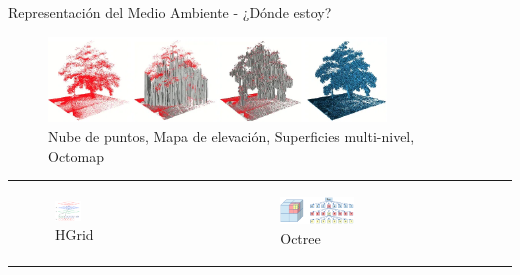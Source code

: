 \documentclass[
  24pt, %
  aspectratio=169, %
]{beamer}
\begin{document}
\begin{frame}{Representación del Medio Ambiente - ¿Dónde estoy?}
  \centering
  \begin{figure}[h]
    \includegraphics[width=0.8\textwidth,height=0.35\textheight]{img4}%
    {\tiny \caption{Nube de puntos, Mapa de elevación, Superficies multi-nivel, Octomap}}
  \end{figure}
  
  \addvspace{\medskipamount}
  \noindent
  \begin{tabularx}{\linewidth}{ @{} X X @{} }
    
    \begin{figure}[h]
      \includegraphics[width=0.2\textwidth,height=0.3\textheight]{hgrid}
      {\tiny \caption{HGrid}}
    \end{figure}
    &
    \begin{figure}[h]
      \includegraphics[width=0.4\textwidth,height=0.3\textheight]{octree}
      {\tiny \caption{Octree}}
    \end{figure}
    
  \end{tabularx}

  
\end{frame}
\end{document}
